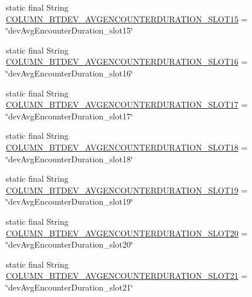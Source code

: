 \begin{DoxyCompactItemize}
\item 
static final String \hyperlink{classcom_1_1copelabs_1_1oiframework_1_1socialproximity_1_1_s_q_lite_helper_a10ed1f74726e7c5904e0fb27b15867f9}{C\+O\+L\+U\+M\+N\+\_\+\+B\+T\+D\+E\+V\+\_\+\+A\+V\+G\+E\+N\+C\+O\+U\+N\+T\+E\+R\+D\+U\+R\+A\+T\+I\+O\+N\+\_\+\+S\+L\+O\+T15} = \char`\"{}dev\+Avg\+Encounter\+Duration\+\_\+slot15\char`\"{}
\item 
static final String \hyperlink{classcom_1_1copelabs_1_1oiframework_1_1socialproximity_1_1_s_q_lite_helper_ab893303f476ecb25a5dc9c5eef2124df}{C\+O\+L\+U\+M\+N\+\_\+\+B\+T\+D\+E\+V\+\_\+\+A\+V\+G\+E\+N\+C\+O\+U\+N\+T\+E\+R\+D\+U\+R\+A\+T\+I\+O\+N\+\_\+\+S\+L\+O\+T16} = \char`\"{}dev\+Avg\+Encounter\+Duration\+\_\+slot16\char`\"{}
\item 
static final String \hyperlink{classcom_1_1copelabs_1_1oiframework_1_1socialproximity_1_1_s_q_lite_helper_a98e049bd52b746d43944a63f42fff246}{C\+O\+L\+U\+M\+N\+\_\+\+B\+T\+D\+E\+V\+\_\+\+A\+V\+G\+E\+N\+C\+O\+U\+N\+T\+E\+R\+D\+U\+R\+A\+T\+I\+O\+N\+\_\+\+S\+L\+O\+T17} = \char`\"{}dev\+Avg\+Encounter\+Duration\+\_\+slot17\char`\"{}
\item 
static final String \hyperlink{classcom_1_1copelabs_1_1oiframework_1_1socialproximity_1_1_s_q_lite_helper_a509946be41aa7b56ce04a2cf9436f819}{C\+O\+L\+U\+M\+N\+\_\+\+B\+T\+D\+E\+V\+\_\+\+A\+V\+G\+E\+N\+C\+O\+U\+N\+T\+E\+R\+D\+U\+R\+A\+T\+I\+O\+N\+\_\+\+S\+L\+O\+T18} = \char`\"{}dev\+Avg\+Encounter\+Duration\+\_\+slot18\char`\"{}
\item 
static final String \hyperlink{classcom_1_1copelabs_1_1oiframework_1_1socialproximity_1_1_s_q_lite_helper_a8dce594a30334354395e9686942a284e}{C\+O\+L\+U\+M\+N\+\_\+\+B\+T\+D\+E\+V\+\_\+\+A\+V\+G\+E\+N\+C\+O\+U\+N\+T\+E\+R\+D\+U\+R\+A\+T\+I\+O\+N\+\_\+\+S\+L\+O\+T19} = \char`\"{}dev\+Avg\+Encounter\+Duration\+\_\+slot19\char`\"{}
\item 
static final String \hyperlink{classcom_1_1copelabs_1_1oiframework_1_1socialproximity_1_1_s_q_lite_helper_a36a84e4d8823b519062be3f0a4d6376e}{C\+O\+L\+U\+M\+N\+\_\+\+B\+T\+D\+E\+V\+\_\+\+A\+V\+G\+E\+N\+C\+O\+U\+N\+T\+E\+R\+D\+U\+R\+A\+T\+I\+O\+N\+\_\+\+S\+L\+O\+T20} = \char`\"{}dev\+Avg\+Encounter\+Duration\+\_\+slot20\char`\"{}
\item 
static final String \hyperlink{classcom_1_1copelabs_1_1oiframework_1_1socialproximity_1_1_s_q_lite_helper_a603b87f26a322abf133c63d8516f418f}{C\+O\+L\+U\+M\+N\+\_\+\+B\+T\+D\+E\+V\+\_\+\+A\+V\+G\+E\+N\+C\+O\+U\+N\+T\+E\+R\+D\+U\+R\+A\+T\+I\+O\+N\+\_\+\+S\+L\+O\+T21} = \char`\"{}dev\+Avg\+Encounter\+Duration\+\_\+slot21\char`\"{}

\end{DoxyCompactItemize}
